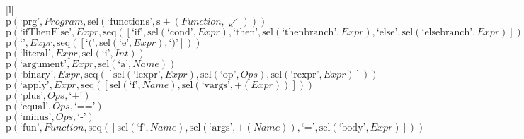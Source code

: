 \footnotesize\begin{center}\begin{tabular}{|l|}\hline
{}
\\\hline
$\mathrm{p}(\text{`prg'},\mathit{Program},\mathrm{sel}\left(\text{`functions'},\mathrm{s}{+}\left(\mathit{Function},{\swarrow}\right)\right))$	\\
$\mathrm{p}(\text{`ifThenElse'},\mathit{Expr},\mathrm{seq}\left(\left[\text{`if'}, \mathrm{sel}\left(\text{`cond'},\mathit{Expr}\right), \text{`then'}, \mathrm{sel}\left(\text{`thenbranch'},\mathit{Expr}\right), \text{`else'}, \mathrm{sel}\left(\text{`elsebranch'},\mathit{Expr}\right)\right]\right))$	\\
$\mathrm{p}(\text{`'},\mathit{Expr},\mathrm{seq}\left(\left[\text{`('}, \mathrm{sel}\left(\text{`e'},\mathit{Expr}\right), \text{`)'}\right]\right))$	\\
$\mathrm{p}(\text{`literal'},\mathit{Expr},\mathrm{sel}\left(\text{`i'},\mathit{Int}\right))$	\\
$\mathrm{p}(\text{`argument'},\mathit{Expr},\mathrm{sel}\left(\text{`a'},\mathit{Name}\right))$	\\
$\mathrm{p}(\text{`binary'},\mathit{Expr},\mathrm{seq}\left(\left[\mathrm{sel}\left(\text{`lexpr'},\mathit{Expr}\right), \mathrm{sel}\left(\text{`op'},\mathit{Ops}\right), \mathrm{sel}\left(\text{`rexpr'},\mathit{Expr}\right)\right]\right))$	\\
$\mathrm{p}(\text{`apply'},\mathit{Expr},\mathrm{seq}\left(\left[\mathrm{sel}\left(\text{`f'},\mathit{Name}\right), \mathrm{sel}\left(\text{`vargs'},{+}\left(\mathit{Expr}\right)\right)\right]\right))$	\\
$\mathrm{p}(\text{`plus'},\mathit{Ops},\text{`+'})$	\\
$\mathrm{p}(\text{`equal'},\mathit{Ops},\text{`=='})$	\\
$\mathrm{p}(\text{`minus'},\mathit{Ops},\text{`-'})$	\\
$\mathrm{p}(\text{`fun'},\mathit{Function},\mathrm{seq}\left(\left[\mathrm{sel}\left(\text{`f'},\mathit{Name}\right), \mathrm{sel}\left(\text{`args'},{+}\left(\mathit{Name}\right)\right), \text{`='}, \mathrm{sel}\left(\text{`body'},\mathit{Expr}\right)\right]\right))$	\\
\hline\end{tabular}\end{center}



